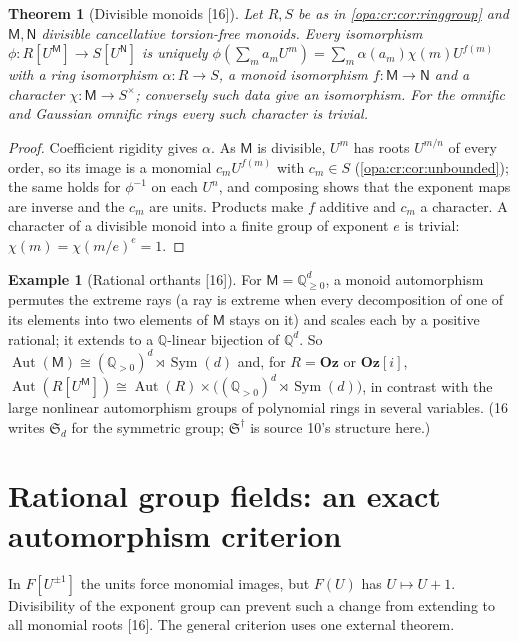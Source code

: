 \documentclass[11pt,oneside]{article}
\numberwithin{equation}{section}
\newtheorem{theorem}{Theorem}[section]
\theoremstyle{definition}
\newtheorem{example}[example]{Example}
\theoremstyle{remark}
\newcommand{\Oz}{\mathbf{Oz}}
\newcommand{\Og}{\mathbf{Oz}[i]}
\newcommand{\Q}{\mathbb Q}
\newcommand{\Aut}{\operatorname{Aut}}
\newcommand{\src}[1]{\textup{\textsf{\small[#1]}}}
\begin{document}
\begin{theorem}[Divisible monoids \src{16}]\label{opa:cr:thm:monoidautos}
Let $R,S$ be as in \cref{opa:cr:cor:ringgroup} and $\mathsf M,\mathsf N$ divisible cancellative torsion-free monoids. Every
isomorphism $\phi:R[U^{\mathsf M}]\to S[U^{\mathsf N}]$ is uniquely
$\phi(\sum_ma_mU^m)=\sum_m\alpha(a_m)\chi(m)U^{f(m)}$ with a ring isomorphism $\alpha:R\to S$, a monoid isomorphism
$f:\mathsf M\to\mathsf N$ and a character $\chi:\mathsf M\to S^\times$; conversely such data give an isomorphism. For the omnific
and Gaussian omnific rings every such character is trivial.
\end{theorem}
\begin{proof}
Coefficient rigidity gives $\alpha$. As $\mathsf M$ is divisible, $U^m$ has roots $U^{m/n}$ of every order, so its image is a
monomial $c_mU^{f(m)}$ with $c_m\in S$ (\cref{opa:cr:cor:unbounded}); the same holds for $\phi^{-1}$ on each $U^n$, and
composing shows that the exponent maps are inverse and the $c_m$ are units. Products make $f$ additive and $c_m$ a
character. A character of a divisible monoid into a finite group of exponent $e$ is trivial:
$\chi(m)=\chi(m/e)^e=1$.
\end{proof}

\begin{example}[Rational orthants \src{16}]\label{opa:cr:ex:orthant}
For $\mathsf M=\Q_{\ge0}^d$, a monoid automorphism permutes the extreme rays (a ray is extreme when every
decomposition of one of its elements into two elements of $\mathsf M$ stays on it) and scales each by a positive
rational; it extends to a $\Q$-linear bijection of $\Q^d$. So $\Aut(\mathsf M)\cong(\Q_{>0})^d\rtimes\operatorname{Sym}(d)$ and,
for $R=\Oz$ or $\Og$, $\Aut(R[U^{\mathsf M}])\cong\Aut(R)\times\bigl((\Q_{>0})^d\rtimes\operatorname{Sym}(d)\bigr)$, in contrast
with the large nonlinear automorphism groups of polynomial rings in several variables. (16 writes $\mathfrak S_d$ for the
symmetric group; $\mathfrak S^\dagger$ is source 10's structure here.)
\end{example}

\section{Rational group fields: an exact automorphism criterion}\label{opa:cr:sec:fields}

In $F[U^{\pm1}]$ the units force monomial images, but $F(U)$ has $U\mapsto U+1$. Divisibility of the exponent group
can prevent such a change from extending to all monomial roots \src{16}. The general criterion uses one external
theorem.
\end{document}
